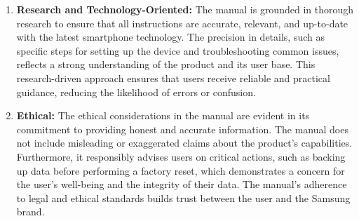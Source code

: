 \documentclass{article}
\begin{document}
\begin{enumerate}
    \item \textbf{Research and Technology-Oriented:} The manual is grounded in thorough research to ensure that all instructions are accurate, relevant, and up-to-date with the latest smartphone technology. The precision in details, such as specific steps for setting up the device and troubleshooting common issues, reflects a strong understanding of the product and its user base. This research-driven approach ensures that users receive reliable and practical guidance, reducing the likelihood of errors or confusion.
    
    \item \textbf{Ethical:} The ethical considerations in the manual are evident in its commitment to providing honest and accurate information. The manual does not include misleading or exaggerated claims about the product's capabilities. Furthermore, it responsibly advises users on critical actions, such as backing up data before performing a factory reset, which demonstrates a concern for the user's well-being and the integrity of their data. The manual's adherence to legal and ethical standards builds trust between the user and the Samsung brand.
\end{enumerate}
\end{document}
